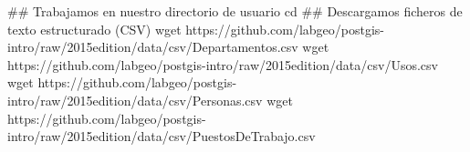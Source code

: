 \lstset{caption=Descarga de ficheros CSV,label=bash:descargarCSV}
\begin{bash}
## Trabajamos en nuestro directorio de usuario
cd
## Descargamos ficheros de texto estructurado (CSV)
wget https://github.com/labgeo/postgis-intro/raw/2015edition/data/csv/Departamentos.csv
wget https://github.com/labgeo/postgis-intro/raw/2015edition/data/csv/Usos.csv
wget https://github.com/labgeo/postgis-intro/raw/2015edition/data/csv/Personas.csv
wget https://github.com/labgeo/postgis-intro/raw/2015edition/data/csv/PuestosDeTrabajo.csv
\end{bash}
